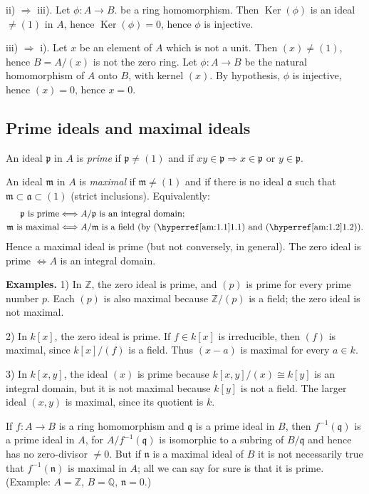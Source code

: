 ii) $\Rightarrow$ iii).  Let $\phi:A\longrightarrow B$. be a ring homomorphism.  Then $\operatorname{Ker}(\phi)$ is an
ideal $\ne(1)$ in $A$, hence $\operatorname{Ker}(\phi)=0$, hence $\phi$ is injective.

iii) $\Rightarrow$ i).  Let $x$ be an element of $A$ which is not a unit.  Then $(x)\ne(1)$,
hence $B=A/(x)$ is not the zero ring.  Let $\phi:A\longrightarrow B$ be the natural homomorphism of $A$ onto $B$, with kernel $(x)$.  By hypothesis, $\phi$ is injective, hence
$(x)=0$, hence $x=0$.\proofbox

\subsection{Prime ideals and maximal ideals}

An ideal $\mathfrak p$ in $A$ is \emph{prime} if $\mathfrak p\ne(1)$ and if $xy\in\mathfrak p\Rightarrow x\in\mathfrak p$ or $y\in\mathfrak p$.

An ideal $\mathfrak m$ in $A$ is \emph{maximal} if $\mathfrak m\ne(1)$ and if there is no ideal $\mathfrak a$ such that
$\mathfrak m\subset\mathfrak a\subset(1)$ (strict inclusions).  Equivalently:
\[
\begin{aligned}
\mathfrak p\text{ is prime}&\Longleftrightarrow A/\mathfrak p\text{ is an integral domain};\\
\mathfrak m\text{ is maximal}&\Longleftrightarrow A/\mathfrak m\text{ is a field (by \amref{1.1} and \amref{1.2}).}
\end{aligned}
\]
Hence a maximal ideal is prime (but not conversely, in general).  The zero ideal
is prime $\Longleftrightarrow A$ is an integral domain.

\textline
\noindent\textbf{Examples.} 1) In $\mathbb Z$, the zero ideal is prime, and
$(p)$ is prime for every prime number $p$.  Each $(p)$ is also maximal because
$\mathbb Z/(p)$ is a field; the zero ideal is not maximal.

2) In $k[x]$, the zero ideal is prime.  If $f\in k[x]$ is irreducible, then
$(f)$ is maximal, since $k[x]/(f)$ is a field.  Thus $(x-a)$ is maximal for
every $a\in k$.

3) In $k[x,y]$, the ideal $(x)$ is prime because
$k[x,y]/(x)\cong k[y]$ is an integral domain, but it is not maximal because
$k[y]$ is not a field.  The larger ideal $(x,y)$ is maximal, since its quotient
is $k$.
\textline

If $f:A\longrightarrow B$ is a ring homomorphism and $\mathfrak q$ is a prime ideal in $B$, then
$f^{-1}(\mathfrak q)$ is a prime ideal in $A$, for $A/f^{-1}(\mathfrak q)$ is isomorphic to a subring of $B/\mathfrak q$ and
hence has no zero-divisor $\ne0$.  But if $\mathfrak n$ is a maximal ideal of $B$ it is not necessarily true that $f^{-1}(\mathfrak n)$ is maximal in $A$; all we can say for sure is that it is prime.
(Example: $A=\mathbb Z$, $B=\mathbb Q$, $\mathfrak n=0$.)

